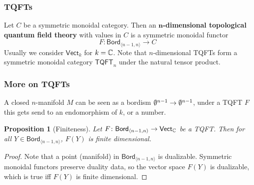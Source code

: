 \documentclass[xcolor=dvipsnames]{beamer}
\newtheorem{prop}{Proposition}[section]
\begin{document}
\begin{frame}
    \frametitle{TQFTs} 
    \begin{definition}
        Let $C$ be a symmetric monoidal category. Then an $\mathbf n$\textbf{-dimensional topological quantum field theory} with values in $C$ is a symmetric monoidal functor \[
        F \colon \mathsf{Bord} _{\langle n-1,n \rangle } \to C
        \] Usually we consider $\mathsf{Vect} _k$ for $k = \mathbb{C}$.
    Note that $n$-dimensional TQFTs form a symmetric monoidal category $\mathsf{TQFT} _n $ under the natural tensor product.
    \end{definition}  
\end{frame}

\begin{frame}
   \frametitle{More on TQFTs}  

   \begin{example}
      A closed $n$-manifold $M$ can be seen as a bordism $\emptyset ^{n-1}\to \emptyset^{n-1}$, under a TQFT $F$ this gets send to an endomorphism of $k$, or a number. 
   \end{example}
   \begin{prop}[Finiteness]
       Let $F \colon \mathsf{Bord} _{\langle n-1,n \rangle } \to \mathsf{Vect} _{\mathbb{C}}$ be a TQFT. Then for all $Y \in \mathsf{Bord} _{\langle n-1,n \rangle }$, $F(Y)$ is finite dimensional.
   \end{prop}
   \begin{proof}
       Note that a point (manifold) in $\mathsf{Bord} _{\langle n-1,n \rangle }$ is dualizable. Symmetric monoidal functors preserve duality data, so the vector space $F(Y)$ is dualizable, which is true iff $F(Y)$ is finite dimensional.\qedhere
   \end{proof}
\end{frame}
\end{document}
